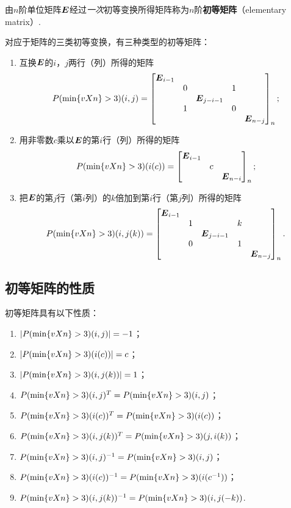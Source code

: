\begin{definition}
由\(n\)阶单位矩阵\(\E\)经过\emph{一次}初等变换所得矩阵称为\(n\)阶\textbf{初等矩阵}（elementary matrix）.
\end{definition}
对应于矩阵的三类初等变换，有三种类型的初等矩阵：
\begin{enumerate}
\item 互换\(\E\)的\(i\)，\(j\)两行（列）所得的矩阵\[
\P(i,j) = \begin{bmatrix}
\E_{i-1} & & & \\
& 0 & & 1 & \\
& & \E_{j-i-1} & & \\
& 1 & & 0 & \\
& & & & \E_{n-j}
\end{bmatrix}_n;
\]
\item 用非零数\(c\)乘以\(\E\)的第\(i\)行（列）所得的矩阵\[
\P(i(c)) = \begin{bmatrix}
\E_{i-1} & & \\
& c & \\
& & \E_{n-i}
\end{bmatrix}_n;
\]
\item 把\(\E\)的第\(j\)行（第\(i\)列）的\(k\)倍加到第\(i\)行（第\(j\)列）所得的矩阵\[
\P(i,j(k)) = \begin{bmatrix}
\E_{i-1} & & & \\
& 1 & & k & \\
& & \E_{j-i-1} & & \\
& 0 & & 1 & \\
& & & & \E_{n-j}
\end{bmatrix}_n.
\]
\end{enumerate}

\subsection{初等矩阵的性质}
\begin{property}\label{theorem:逆矩阵.初等矩阵的性质1}
初等矩阵具有以下性质：
\begin{enumerate}
\item \(\abs{\P(i,j)}=-1\)；
\item \(\abs{\P(i(c))}=c\)；
\item \(\abs{\P(i,j(k))}=1\)；
\item \(\P(i,j)^T=\P(i,j)\)；
\item \(\P(i(c))^T=\P(i(c))\)；
\item \(\P(i,j(k))^T=\P(j,i(k))\)；
\item \(\P(i,j)^{-1}=\P(i,j)\)；
\item \(\P(i(c))^{-1}=\P(i(c^{-1}))\)；
\item \(\P(i,j(k))^{-1}=\P(i,j(-k))\).
\end{enumerate}
\end{property}

